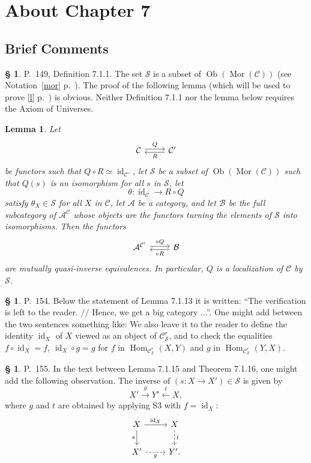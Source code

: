 \documentclass[12pt]{article}
\newtheorem{lem}[thm]{Lemma}
\theoremstyle{remark}
\theoremstyle{definition}
\newtheorem{s}[thm]{\S}
\newcommand{\cc}{\mathcal}
\newcommand{\A}{\mathcal A}
\newcommand{\B}{\mathcal B}
\newcommand{\C}{\mathcal C}
\newcommand{\xr}{\xrightarrow}
\DeclareMathOperator{\id}{id}
\DeclareMathOperator{\Hom}{Hom}
\DeclareMathOperator{\Mor}{Mor}
\DeclareMathOperator{\Ob}{Ob}
\begin{document}
\section{About Chapter 7}

\subsection{Brief Comments}

\begin{s} 
P.~149, Definition 7.1.1. The set $\cc S$ is a subset of $\Ob(\Mor(\C))$ (see Notation~\ref{mor} p.~\pageref{mor}). The proof of the following lemma (which will be used to prove \eqref{l} p.~\pageref{l}) is obvious. Neither Definition 7.1.1 nor the lemma below requires the Axiom of Universes.

\begin{lem}\label{711}
Let 
$$
\begin{tikzcd}\C\ar[yshift=.5ex]{r}{Q}&\C'\ar[yshift=-.4ex]{l}{R}\end{tikzcd}
$$ 
be functors such that $Q\circ R\simeq\id_{\C'}$, let $\cc S$ be a subset of $\Ob(\Mor(\C))$ such that $Q(s)$ is an isomorphism for all $s$ in $\cc S$, let 
$$
\theta:\id_\C\to R\circ Q
$$ 
satisfy $\theta_X\in\cc S$ for all $X$ in $\C$, let $\A$ be a category, and let $\B$ be the full subcategory of $\A^\C$ whose objects are the functors turning the elements of $\cc S$ into isomorphisms. Then the functors
$$
\begin{tikzcd}\A^{\C'}\ar[yshift=.4ex]{r}{\circ Q}&\B\ar[yshift=-.5ex]{l}{\circ R}\end{tikzcd}
$$
are mutually quasi-inverse equivalences. In particular, $Q$ is a localization of $\C$ by $\cc S$. 
\end{lem}
\end{s}

%

\begin{s} 
P.~154. Below the statement of Lemma 7.1.13 it is written: ``The verification is left to the reader. // Hence, we get a big category ...''. One might add between the two sentences something like: We also leave it to the reader to define the identity $\id_X$ of $X$ viewed as an object of $\C^r_{\mathcal S}$, and to check the equalities $f\circ\id_X=f$, $\id_X\circ g=g$ for $f$ in $\Hom_{\C^r_{\mathcal S}}(X,Y)$ and $g$ in $\Hom_{\C^r_{\mathcal S}}(Y,X)$.
\end{s}

%

\begin{s} 
P.~155. In the text between Lemma 7.1.15 and Theorem 7.1.16, one might add the following observation. The inverse of $(s:X\to X')\in\mathcal S$ is given by 
$$
X'\xr gY'\overset{t}{\leftarrow}X,
$$
where $g$ and $t$ are obtained by applying S3 with $f=\id_X$:
$$
\begin{tikzcd}
X\ar{r}{\id_X}\ar{d}[swap]{s}&X\ar[dashed]{d}{t}\\ X'\ar[dashed]{r}[swap]{g}&Y'.
\end{tikzcd}
$$
\end{s}
\end{document}
